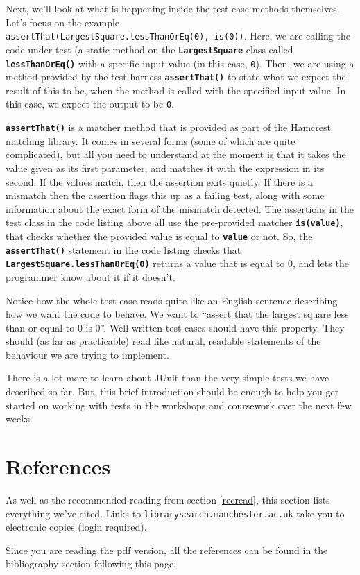 \documentclass[
]{book}
\begin{document}
Next, we'll look at what is happening inside the test case methods themselves. Let's focus on the example \texttt{assertThat(LargestSquare.lessThanOrEq(0),\ is(0))}. Here, we are calling the code under test (a static method on the \textbf{\texttt{LargestSquare}} class called \textbf{\texttt{lessThanOrEq()}} with a specific input value (in this case, \texttt{0}). Then, we are using a method provided by the test harness \textbf{\texttt{assertThat()}} to state what we expect the result of this to be, when the method is called with the specified input value. In this case, we expect the output to be \texttt{0}.

\textbf{\texttt{assertThat()}} is a matcher method that is provided as part of the Hamcrest matching library. It comes in several forms (some of which are quite complicated), but all you need to understand at the moment is that it takes the value given as its first parameter, and matches it with the expression in its second. If the values match, then the assertion exits quietly. If there is a mismatch then the assertion flags this up as a failing test, along with some information about the exact form of the mismatch detected. The assertions in the test class in the code listing above all use the pre-provided matcher \textbf{\texttt{is(value)}}, that checks whether the provided value is equal to \textbf{\texttt{value}} or not. So, the \textbf{\texttt{assertThat()}} statement in the code listing checks that \textbf{\texttt{LargestSquare.lessThanOrEq(0)}} returns a value that is equal to 0, and lets the programmer know about it if it doesn't.

Notice how the whole test case reads quite like an English sentence describing how we want the code to behave. We want to ``assert that the largest square less than or equal to 0 is 0''. Well-written test cases should have this property. They should (as far as practicable) read like natural, readable statements of the behaviour we are trying to implement.

There is a lot more to learn about JUnit than the very simple tests we have described so far. But, this brief introduction should be enough to help you get started on working with tests in the workshops and coursework over the next few weeks.

\hypertarget{reading}{%
\chapter{References}\label{reading}}

As well as the recommended reading from section \ref{recread}, this section lists everything we've cited. Links to \texttt{librarysearch.manchester.ac.uk} take you to electronic copies (login required).

Since you are reading the pdf version, all the references can be found in the bibliography section following this page.

  
\end{document}
